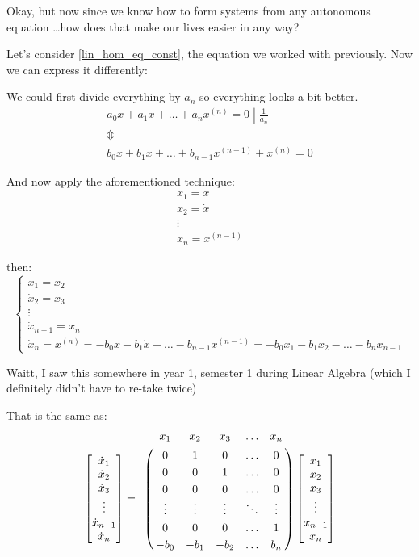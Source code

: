 Okay, but now since we know how to form systems from any autonomous equation \dots how does that make our lives easier in any way?

Let's consider \ref{lin_hom_eq_const}, the equation we worked with previously. Now we can express it differently:

We could first divide everything by $a_{n}$ so everything looks a bit better.
\begin{gather*}
  \left. a_0 x + a_1\dot{x}+ \dots +a_{n} x^{(n)} = 0 \middle| \frac{1}{a_{n}} \right. \\
  \Updownarrow \\
  b_0 x + b_1\dot{x} + \dots + b_{n-1} x^{(n-1)} + x^{(n)} = 0
\end{gather*}

And now apply the aforementioned technique:
\begin{gather*}
  x_1 = x     \\
  x_2 = \dot{x} \\
  \vdots \\
  x_n = x^{(n-1)}
\end{gather*}

then:
\[
  \begin{cases}
    \dot{x}_1 = x_2     \\
    \dot{x}_2 = x_3     \\
    \vdots              \\
    \dot{x}_{n-1} = x_n \\
    \dot{x}_n  = x^{(n)} = -b_0x - b_1\dot{x} - \dots - b_{n-1} x^{(n-1)} = -b_0 x_1 - b_1 x_2 - \dots - b_n x_{n-1}
  \end{cases}
\]

Waitt, I saw this somewhere in year 1, semester 1 during Linear Algebra (which I definitely didn't have to re-take twice)

That is the same as:
\begin{align*}
  \begin{bmatrix}
    \dot{x}_1     \\
    \dot{x}_2     \\
    \dot{x}_3     \\
    \vdots        \\
    \dot{x}_{n-1} \\
    \dot{x}_n
  \end{bmatrix} =
  \bordermatrix{ & x_1    & x_2    & x_3    & \ldots & x_n \cr
    & 0      & 1      & 0      & \ldots & 0 \cr
    & 0      & 0      & 1      & \ldots & 0 \cr
    & 0      & 0      & 0      & \ldots & 0 \cr
    & \vdots & \vdots & \vdots & \ddots & \vdots \cr
    & 0      & 0      & 0      & \ldots & 1 \cr
  & -b_0   & -b_1   & -b_2   & \ldots & b_n }
  \begin{bmatrix}
    x_1     \\
    x_2     \\
    x_3     \\
    \vdots  \\
    x_{n-1} \\
    x_n
  \end{bmatrix}
\end{align*}

